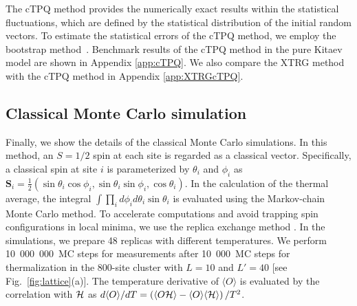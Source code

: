 \documentclass[twocolumn,superscriptaddress,showpacs, longbibliography, aps, prb]{revtex4-2}
\newcommand{\red}[1]{\textcolor{red}{#1}}
\newcommand{\blue}[1]{\textcolor{blue}{#1}}
\newcommand{\orange}[1]{\textcolor{orange}{#1}}
\begin{document}
The cTPQ method %
provides the numerically exact
results within the statistical fluctuations,
which are defined by the statistical distribution of the initial random vectors.
To %
estimate the statistical errors %
of the cTPQ method, 
we employ the bootstrap method~\cite{HPhi_v2}.
Benchmark results of the cTPQ method in the pure Kitaev model are 
shown in Appendix \ref{app:cTPQ}. We also %
compare %
the XTRG method %
with the cTPQ method in Appendix \ref{app:XTRGcTPQ}.

\subsection{Classical Monte Carlo simulation}
Finally, we show the details of the classical Monte Carlo simulations.
In this method, an $S=1/2$ spin at each site is regarded as a classical vector.
Specifically, a classical spin at site $i$ is parameterized by $\theta_i$ and $\phi_i$ as
$\bm{S}_i = \frac{1}{2}(\sin\theta_i\cos\phi_i, \sin\theta_i\sin\phi_i, \cos\theta_i)$.
In the calculation of the thermal average, the integral $\int \prod_i d\phi_i d\theta_i \sin\theta_i$ is evaluated %
using the Markov-chain Monte Carlo method.
To accelerate %
computations and avoid trapping %
spin configurations %
in local minima, we use the replica exchange method \cite{Hukushima1996}.
In the simulations, we prepare 48 replicas with different temperatures.
We perform 10~000~000~MC steps for measurements after 10~000~MC steps for thermalization in the 800-site cluster with $L=10$ and $L'=40$
[see Fig.~\ref{fig:lattice}(a)].
The temperature derivative of $\langle O \rangle$ is evaluated by the correlation with ${\cal H}$ as  $d\langle O \rangle/dT=\left(\langle O %
{\cal H}\rangle -\langle O %
\rangle \langle {\cal H}\rangle \right)/T^2$. 
\end{document}
